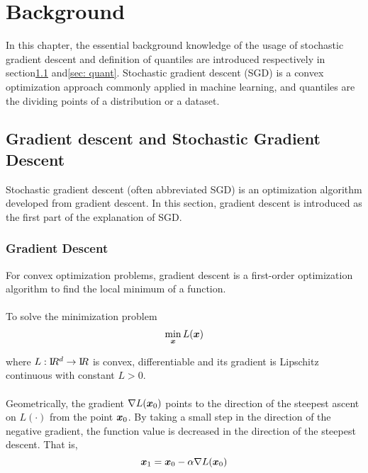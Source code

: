 
\chapter{Background}
\label{ch: background}
In this chapter, the essential background knowledge of the usage of stochastic gradient descent and definition of quantiles are introduced respectively in section\ref{sec: sgd} and\ref{sec: quant}. Stochastic gradient descent (SGD) is a convex optimization approach commonly applied in machine learning, and quantiles are the dividing points of a distribution or a dataset.

\section{Gradient descent and Stochastic Gradient Descent}
\label{sec: sgd}
    Stochastic gradient descent (often abbreviated SGD) is an optimization algorithm developed from gradient descent. 
    In this section, gradient descent is introduced as the first part of the explanation of SGD.

    \subsection{Gradient Descent}
        For convex optimization problems, gradient descent is a first-order optimization algorithm 
        to find the local minimum of a function.
        \\\\
        To solve the minimization problem 
        \begin{equation}
            \min_{\bm{x}} L(\bm{x}) 
        \end{equation} 
        
        where $L : \mathrm I\!R^d \to \mathrm I\!R$ is convex, differentiable and its gradient is Lipschitz continuous with constant
        $L > 0$.
        \\\\
        Geometrically, the gradient $\nabla L(\bm{x}_0)$ points to the direction of the steepest ascent on $L(\cdot)$ 
        from the point $\bm{x}_0$. 
        By taking a small step in the direction of the negative gradient, the function value is decreased in the 
        direction of the steepest descent. That is,
        \begin{equation}
            \bm{x}_1  = \bm{x}_0 - \alpha \nabla L(\bm{x}_0)
        \end{equation}
    
